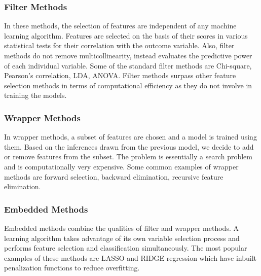 \documentclass[a4paper, 14pt]{article}
\begin{document}
\subsubsection{Filter Methods}
\begin{justify}
In these methods, the selection of features are independent of any machine learning algorithm. Features are selected on the basis of their scores in various statistical tests for their correlation with the outcome variable. Also, filter methods do not remove multicollinearity, instead evaluates the predictive power of each individual variable. Some of the standard filter methods are Chi-square, Pearson's correlation, LDA, ANOVA. Filter methods surpass other feature selection methods in terms of computational efficiency as they do not involve in training the models.
\end{justify}

\subsubsection{Wrapper Methods}
\begin{justify}
In wrapper methods, a subset of features are chosen and a model is trained using them. Based on the inferences drawn from the previous model, we decide to add or remove features from the subset. The problem is essentially a search problem and is computationally very expensive. 
Some common examples of wrapper methods are forward selection, backward elimination, recursive feature elimination.
\end{justify}

\subsubsection{Embedded Methods}
\begin{justify}
Embedded methods combine the qualities of filter and wrapper methods. A learning algorithm takes advantage of its own variable selection process and performs feature selection and classification simultaneously. The most popular examples of these methods are LASSO and RIDGE regression which have inbuilt penalization functions to reduce overfitting.
\end{justify}


\vspace*{2\baselineskip}

\vspace*{2\baselineskip}


\clearpage
\end{document}

